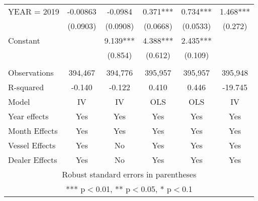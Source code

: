 \begin{tabular}{lccccc}
YEAR = 2019 & -0.00863 & -0.0984 & 0.371*** & 0.734*** & 1.468*** \\
 & (0.0903) & (0.0908) & (0.0668) & (0.0533) & (0.272) \\
Constant &  & 9.139*** & 4.388*** & 2.435*** &  \\
 &  & (0.854) & (0.612) & (0.109) &  \\
 &  &  &  &  &  \\
Observations & 394,467 & 394,776 & 395,957 & 395,957 & 395,948 \\
R-squared & -0.140 & -0.122 & 0.410 & 0.446 & -19.745 \\
Model & IV & IV & OLS & OLS & IV \\
Year effects & Yes & Yes & Yes & Yes & Yes \\
Month Effects & Yes & Yes & Yes & Yes & Yes \\
Vessel Effects & Yes & No & Yes & Yes & Yes \\
 Dealer Effects & Yes & No & Yes & Yes & Yes \\ \hline
\multicolumn{6}{c}{ Robust standard errors in parentheses} \\
\multicolumn{6}{c}{ *** p$<$0.01, ** p$<$0.05, * p$<$0.1} \\
\end{tabular}

